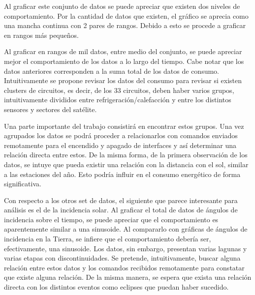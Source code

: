 \documentclass[../Main.tex]{subfiles}
\begin{document}
Al graficar este conjunto de datos se puede apreciar que existen dos niveles de comportamiento. Por la cantidad de datos que existen, el gráfico se aprecia como una mancha continua con 2 pares de rangos. Debido a esto se procede a graficar en rangos más pequeños.

Al graficar en rangos de mil datos, entre medio del conjunto, se puede apreciar mejor el comportamiento de los datos a lo largo del tiempo. Cabe notar que los datos anteriores corresponden a la suma total de los datos de consumo. Intuitivamente se propone revisar los datos del consumo para revisar si existen clusters de circuitos, es decir, de los 33 circuitos, deben haber varios grupos, intuitivamente divididos entre refrigeración/calefacción y entre los distintos sensores y sectores del satélite.

Una parte importante del trabajo consistirá en encontrar estos grupos. Una vez agrupados los datos se podrá proceder a relacionarlos con comandos enviados remotamente para el encendido y apagado de interfaces y así determinar una relación directa entre estos. De la misma forma, de la primera observación de los datos, se intuye que pueda existir una relación con la distancia con el sol, similar a las estaciones del año. Esto podría influir en el consumo energético de forma significativa.

Con respecto a los otros set de datos, el siguiente que parece interesante para análisis es el de la incidencia solar. Al graficar el total de datos de ángulos de incidencia sobre el tiempo, se puede apreciar que el comportamiento es aparentemente similar a una sinusoide. Al compararlo con gráficas de ángulos de incidencia en la Tierra, se infiere que el comportamiento debería ser, efectivamente, una sinusoide. Los datos, sin embargo, presentan varias lagunas y varias etapas con discontinuidades. Se pretende, intuitivamente, buscar alguna relación entre estos datos y los comandos recibidos remotamente para constatar que existe alguna relación. De la misma manera, se espera que exista una relación directa con los distintos eventos como eclipses que puedan haber sucedido.
\end{document}

